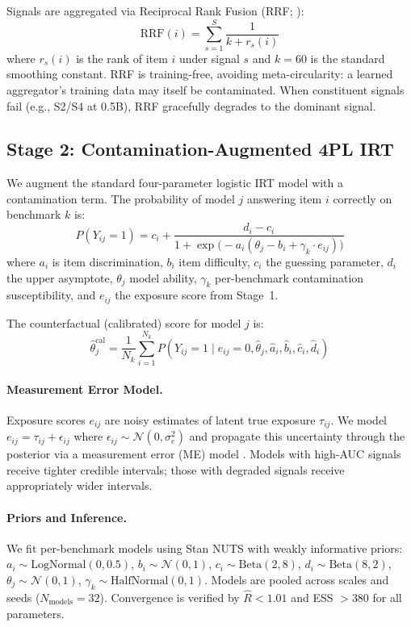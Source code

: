 \documentclass[11pt,a4paper]{article}
\newcommand{\given}{\mid}
\begin{document}
Signals are aggregated via Reciprocal Rank Fusion (RRF; \citealt{cormack2009reciprocal}):
\begin{equation}
\text{RRF}(i) = \sum_{s=1}^{S} \frac{1}{k + r_s(i)}
\end{equation}
where $r_s(i)$ is the rank of item $i$ under signal $s$ and $k=60$ is the standard smoothing constant.
RRF is training-free, avoiding meta-circularity: a learned aggregator's training data may itself be contaminated.
When constituent signals fail (e.g., S2/S4 at 0.5B), RRF gracefully degrades to the dominant signal.

\subsection{Stage 2: Contamination-Augmented 4PL IRT}

We augment the standard four-parameter logistic IRT model \citep{deboeck2004explanatory} with a contamination term.
The probability of model $j$ answering item $i$ correctly on benchmark $k$ is:
\begin{equation}
P(Y_{ij}=1) = c_i + \frac{d_i - c_i}{1 + \exp\!\bigl(-a_i(\theta_j - b_i + \gamma_k \cdot e_{ij})\bigr)}
\end{equation}
where $a_i$ is item discrimination, $b_i$ item difficulty, $c_i$ the guessing parameter, $d_i$ the upper asymptote, $\theta_j$ model ability, $\gamma_k$ per-benchmark contamination susceptibility, and $e_{ij}$ the exposure score from Stage~1.

The counterfactual (calibrated) score for model $j$ is:
\begin{equation}
\hat{\theta}_j^{\text{cal}} = \frac{1}{N_k}\sum_{i=1}^{N_k} P(Y_{ij}=1 \given e_{ij}=0, \hat{\theta}_j, \hat{a}_i, \hat{b}_i, \hat{c}_i, \hat{d}_i)
\end{equation}

\paragraph{Measurement Error Model.}
Exposure scores $e_{ij}$ are noisy estimates of latent true exposure $\tau_{ij}$.
We model $e_{ij} = \tau_{ij} + \epsilon_{ij}$ where $\epsilon_{ij} \sim \mathcal{N}(0, \sigma^2_e)$ and propagate this uncertainty through the posterior via a measurement error (ME) model \citep{carroll2006measurement}.
Models with high-AUC signals receive tighter credible intervals; those with degraded signals receive appropriately wider intervals.

\paragraph{Priors and Inference.}
We fit per-benchmark models using Stan NUTS \citep{carpenter2017stan} with weakly informative priors: $a_i \sim \text{LogNormal}(0, 0.5)$, $b_i \sim \mathcal{N}(0, 1)$, $c_i \sim \text{Beta}(2, 8)$, $d_i \sim \text{Beta}(8, 2)$, $\theta_j \sim \mathcal{N}(0, 1)$, $\gamma_k \sim \text{HalfNormal}(0, 1)$.
Models are pooled across scales and seeds ($N_{\text{models}} = 32$).
Convergence is verified by $\hat{R} < 1.01$ and ESS $> 380$ for all parameters.
\end{document}
